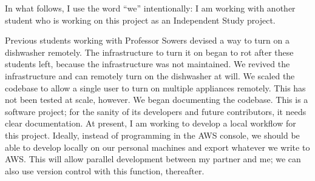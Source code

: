 \documentclass[a4paper]{article}
\begin{document}
In what follows, I use the word ``we'' intentionally: I am working with another student who is working on this project as an Independent Study project.

\begin{outline}
    \1 Previous students working with Professor Sowers devised a way to turn on a dishwasher remotely. The infrastructure to turn it on began to
    rot after these students left, because the infrastructure was not maintained. We revived the infrastructure and can remotely turn on the dishwasher at will.
    \1 We scaled the codebase to allow a single user to turn on multiple appliances remotely. This has not been tested at scale, however.
    \1 We began documenting the codebase. This is a software project; for the sanity of its developers and future contributors, it needs clear documentation.
    \1 At present, I am working to develop a local workflow for this project. Ideally, instead of programming in the AWS console, we should be able to develop locally on our personal
    machines and export whatever we write to AWS. This will allow parallel development between my partner and me; we can also use version control with this function, thereafter.
\end{outline}


    
\end{document}
